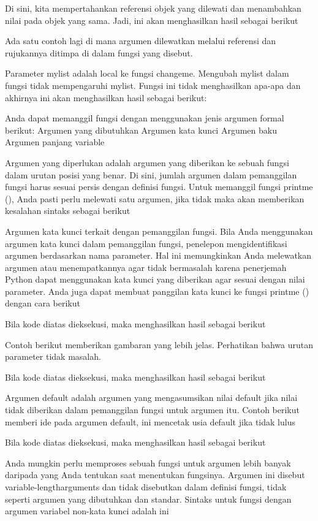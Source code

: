 Di sini, kita mempertahankan referensi objek yang dilewati dan menambahkan nilai pada objek yang sama. Jadi, ini akan menghasilkan hasil sebagai berikut 

Ada satu contoh lagi di mana argumen dilewatkan melalui referensi dan rujukannya ditimpa di dalam fungsi yang disebut. 

Parameter mylist adalah local ke fungsi changeme. Mengubah mylist dalam fungsi tidak mempengaruhi mylist. Fungsi ini tidak menghasilkan apa-apa dan akhirnya ini akan menghasilkan hasil sebagai berikut: \par

Anda dapat memanggil fungsi dengan menggunakan jenis argumen formal berikut: 
Argumen yang dibutuhkan 
Argumen kata kunci 
Argumen baku 
Argumen panjang variable 

Argumen yang diperlukan adalah argumen yang diberikan ke sebuah fungsi dalam urutan posisi yang benar. Di sini, jumlah argumen dalam pemanggilan fungsi harus sesuai persis dengan definisi fungsi. Untuk memanggil fungsi printme (), Anda pasti perlu melewati satu argumen, jika tidak maka akan memberikan kesalahan sintaks sebagai berikut 

Argumen kata kunci terkait dengan pemanggilan fungsi. Bila Anda menggunakan argumen kata kunci dalam pemanggilan fungsi, penelepon mengidentifikasi argumen berdasarkan nama parameter. Hal ini memungkinkan Anda melewatkan argumen atau menempatkannya agar tidak bermasalah karena penerjemah Python dapat menggunakan kata kunci yang diberikan agar sesuai dengan nilai parameter. Anda juga dapat membuat panggilan kata kunci ke fungsi printme () dengan cara berikut 

Bila kode diatas dieksekusi, maka menghasilkan hasil sebagai berikut 

Contoh berikut memberikan gambaran yang lebih jelas. Perhatikan bahwa urutan parameter tidak masalah. 

Bila kode diatas dieksekusi, maka menghasilkan hasil sebagai berikut 

Argumen default adalah argumen yang mengasumsikan nilai default jika nilai tidak diberikan dalam pemanggilan fungsi untuk argumen itu. Contoh berikut memberi ide pada argumen default, ini mencetak usia default jika tidak lulus

Bila kode diatas dieksekusi, maka menghasilkan hasil sebagai berikut 

Anda mungkin perlu memproses sebuah fungsi untuk argumen lebih banyak daripada yang Anda tentukan saat menentukan fungsinya. Argumen ini disebut variable-lengtharguments dan tidak disebutkan dalam definisi fungsi, tidak seperti argumen yang dibutuhkan dan standar. 
Sintaks untuk fungsi dengan argumen variabel non-kata kunci adalah ini 

